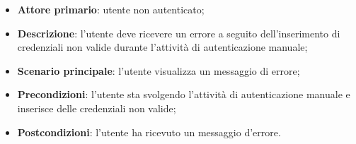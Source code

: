 \label{uc:login_err}
\begin{itemize}
    \item \textbf{Attore primario}: utente non autenticato;
    \item \textbf{Descrizione}: l'utente deve ricevere un errore a seguito dell'inserimento di credenziali non valide durante l'attività di autenticazione manuale;
    \item \textbf{Scenario principale}: l'utente visualizza un messaggio di errore;
    \item \textbf{Precondizioni}: l'utente sta svolgendo l'attività di autenticazione manuale e inserisce delle credenziali non valide;
    \item \textbf{Postcondizioni}: l'utente ha ricevuto un messaggio d'errore.
\end{itemize}

